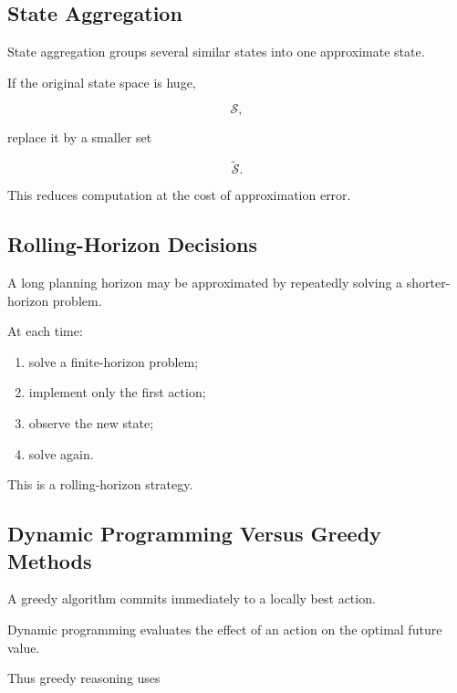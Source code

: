 \subsection{State Aggregation}
\label{subsec:state-aggregation}

State aggregation groups several similar states into one approximate
state.

If the original state space is huge,

\[
\mathcal{S},
\]

replace it by a smaller set

\[
\boxed{
\widetilde{\mathcal{S}}.
}
\]

This reduces computation at the cost of approximation error.

\subsection{Rolling-Horizon Decisions}
\label{subsec:rolling-horizon-dp}

A long planning horizon may be approximated by repeatedly solving a
shorter-horizon problem.

At each time:

\begin{enumerate}
    \item solve a finite-horizon problem;
    \item implement only the first action;
    \item observe the new state;
    \item solve again.
\end{enumerate}

This is a rolling-horizon strategy.

\subsection{Dynamic Programming Versus Greedy Methods}
\label{subsec:dp-versus-greedy}

A greedy algorithm commits immediately to a locally best action.

Dynamic programming evaluates the effect of an action on the optimal
future value.

Thus greedy reasoning uses

